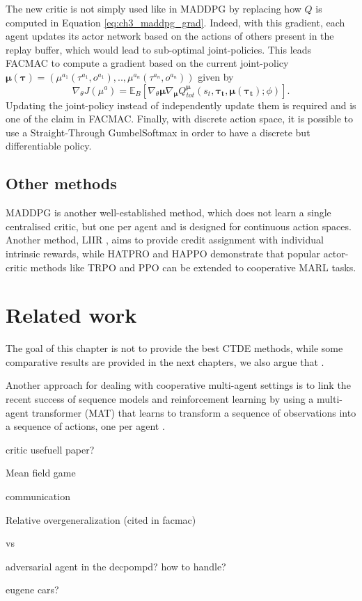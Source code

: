 The new critic is not simply used like in MADDPG by replacing how $Q$ is computed in Equation \ref{eq:ch3_maddpg_grad}.
Indeed, with this gradient, each agent updates its actor network based on the actions of others present in the replay buffer, which would lead to sub-optimal joint-policies.
This leads FACMAC to compute a gradient based on the current joint-policy $\mathbf{\mu}(\mathbf{\tau}) = (\mu^{a_1}(\tau^{a_1}, o^{a_1}), .., \mu^{a_n}(\tau^{a_n}, o^{a_n}))$ given by
\begin{equation}
\label{eq:ch3_facmac_grad}
    \nabla_\theta J(\mu^a) = \mathbb{E}_B\left[\nabla_{\theta} \mathbf{\mu} \nabla_{\mathbf{\mu}} Q_{tot}^{\mathbf{\mu}}(s_t, \mathbf{\tau_t}, \mathbf{\mu}(\mathbf{\tau_t}); \phi)\right].
\end{equation}
Updating the joint-policy instead of independently update them is required and is one of the claim in FACMAC.
Finally, with discrete action space, it is possible to use a Straight-Through GumbelSoftmax \citep{} in order to have a discrete but differentiable policy.

\subsection{Other methods}
MADDPG \citep{lowe2017multi} is another well-established method, which does not learn a single centralised critic, but one per agent and is designed for continuous action spaces.
Another method, LIIR \citep{Du2019LIIRLearning}, aims to provide credit assignment with individual intrinsic rewards, while HATPRO and HAPPO \citep{kuba2021trust} demonstrate that popular actor-critic methods like TRPO \citep{schulman2015trust} and PPO \citep{schulman2017ppo} can be extended to cooperative MARL tasks.

\section{Related work}
The goal of this chapter is not to provide the best CTDE methods, while some comparative results are provided in the next chapters, we also argue that \citep{gorsane2022towards}.

Another approach for dealing with cooperative multi-agent settings is to link the recent success of sequence models and reinforcement learning by using a multi-agent transformer (MAT) that learns to transform a sequence of observations into a sequence of actions, one per agent \citep{wen2022multiagent}.


critic usefuell paper?

Mean field game

communication

Relative overgeneralization (cited in facmac)


\citep{lyu2021contrasting} vs \citep{peng2021facmac}

adversarial agent in the decpompd? how to handle?

eugene cars?